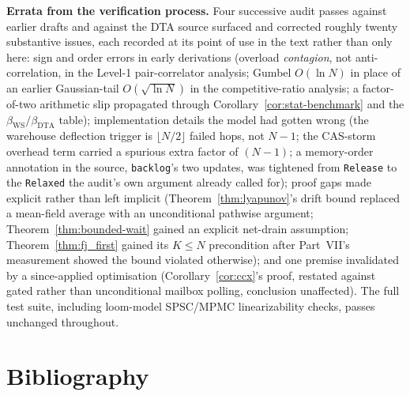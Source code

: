 \documentclass[11pt,a4paper]{report}
\newcommand{\code}[1]{\texttt{#1}}
\newcommand{\dtact}{\textsc{DTA}}
\begin{document}
\medskip
\noindent\textbf{Errata from the verification process.}
Four successive audit passes against earlier drafts and against the
\dtact{} source surfaced and corrected roughly twenty substantive
issues, each recorded at its point of use in the text rather than only
here: sign and order errors in early derivations (overload
\emph{contagion}, not anti-correlation, in the Level-1 pair-correlator
analysis; Gumbel $O(\ln N)$ in place of an earlier Gaussian-tail
$O(\sqrt{\ln N})$ in the competitive-ratio analysis; a factor-of-two
arithmetic slip propagated through
Corollary~\ref{cor:stat-benchmark} and the
$\beta_{\mathrm{WS}}/\beta_{\mathrm{DTA}}$ table); implementation
details the model had gotten wrong (the warehouse deflection trigger
is $\lfloor N/2\rfloor$ failed hops, not $N-1$; the CAS-storm overhead
term carried a spurious extra factor of $(N-1)$; a memory-order
annotation in the source, \code{backlog}'s two updates, was tightened
from \code{Release} to the \code{Relaxed} the audit's own argument
already called for); proof gaps made explicit rather than left
implicit (Theorem~\ref{thm:lyapunov}'s drift bound replaced a
mean-field average with an unconditional pathwise argument;
Theorem~\ref{thm:bounded-wait} gained an explicit net-drain
assumption; Theorem~\ref{thm:fj_first} gained its $K \leq N$
precondition after Part~VII's measurement showed the bound violated
otherwise); and one premise invalidated by a since-applied
optimisation (Corollary~\ref{cor:ccx}'s proof, restated against gated
rather than unconditional mailbox polling, conclusion unaffected). The
full test suite, including loom-model SPSC/MPMC linearizability
checks, passes unchanged throughout.

\part*{Bibliography}


\end{document}
